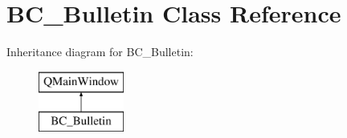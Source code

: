 \hypertarget{class_b_c___bulletin}{}\section{B\+C\+\_\+\+Bulletin Class Reference}
\label{class_b_c___bulletin}
Inheritance diagram for B\+C\+\_\+\+Bulletin\+:\begin{figure}[H]
\begin{center}
\leavevmode
\includegraphics[height=2.000000cm]{class_b_c___bulletin}
\end{center}
\end{figure}
